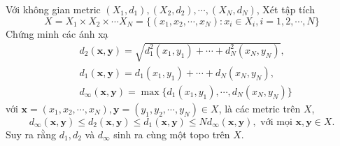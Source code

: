 \begin{exercise}{9}
    Với không gian metric $(X_1,d_1), (X_2,d_2), \cdots, (X_N,d_N)$, Xét tập tích
    $$
        X = X_1 \times X_2 \times \cdots X_N = \{(x_1,x_2,\cdots,x_N): x_i \in X_i, i = 1,2,\cdots,N\}
    $$
    Chứng minh các ánh xạ
    \begin{align*}
        &d_2(\mathbf{x}, \mathbf{y}) = \sqrt{d_1^2(x_1,y_1) + \cdots + d_N^2(x_N,y_N)},\\
        &d_1(\mathbf{x}, \mathbf{y}) = d_1(x_1,y_1) + \cdots + d_N(x_N,y_N),\\
        &d_{\infty}(\mathbf{x}, \mathbf{y}) = \max\{d_1(x_1,y_1), \cdots, d_N(x_N,y_N)\}
    \end{align*}
    với $\mathbf{x} = (x_1,x_2,\cdots,x_N), \mathbf{y} = (y_1,y_2,\cdots,y_N) \in X$, là các metric trên $X$,
    $$
        d_{\infty}(\mathbf{x}, \mathbf{y}) \leq d_{2}(\mathbf{x}, \mathbf{y}) \leq d_{1}(\mathbf{x}, \mathbf{y}) \leq N d_{\infty}(\mathbf{x}, \mathbf{y}), \text{ với mọi } \mathbf{x}, \mathbf{y} \in X.
    $$
    Suy ra rằng $d_1,d_2$ và $d_{\infty}$ sinh ra cùng một topo trên $X$.
\end{exercise}

